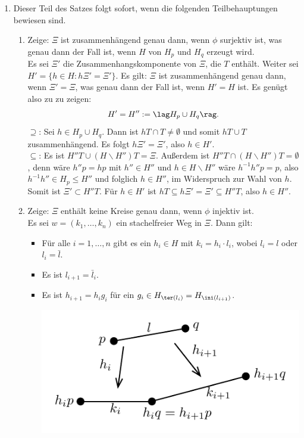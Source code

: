 \bew \begin{enumerate}
\item Dieser Teil des Satzes folgt sofort, wenn die folgenden
Teilbehauptungen bewiesen sind.
\begin{enumerate}
\item Zeige: $\Xi$ ist zusammenhängend genau dann, wenn $\phi$
surjektiv ist, was genau dann der Fall ist, wenn
$H$ von $H_p$ und $H_q$ erzeugt wird.\\
Es sei $\Xi'$ die Zusammenhangskomponente von $\Xi$, die $T$ enthält.
Weiter sei $H'=\{ h\in H : h\Xi' = \Xi' \}$.
Es gilt: $\Xi$ ist zusammenhängend genau dann, wenn $\Xi'=\Xi$, was
genau dann der Fall ist, wenn $H'=H$ ist.
Es genügt also zu zu zeigen:
\[
H' = H'' := \lag H_p \cup H_q \rag.
\]
\glqq$\supseteq$\grqq:
Sei $h\in H_p\cup H_q$. Dann ist
$hT\cap T\neq\emptyset$ und somit $hT\cup T$ zusammenhängend.
Es folgt $h\Xi'=\Xi'$, also $h\in H'$.\\
\glqq$\subseteq$\grqq:
Es ist $H'' T\cup(H\backslash H'')T= \Xi$. Außerdem ist
$H'' T\cap(H\backslash H'')T = \emptyset$, denn wäre
$h''p=hp$ mit $h''\in H''$ und $h\in H\backslash H''$
wäre $h^{-1}h''p=p$, also $h^{-1}h''\in H_p\leq H''$ und folglich
$h\in H''$, im Widerspruch zur Wahl von $h$.
Somit ist $\Xi'\subset H'' T$. Für $h\in H'$ ist
$hT\subseteq h\Xi'=\Xi'\subseteq H'' T$, also $h\in H''$.
\item Zeige: $\Xi$ enthält keine Kreise genau dann, wenn
$\phi$ injektiv ist.\\
Es sei $w=(k_1,\ldots,k_n)$ ein stachelfreier Weg in $\Xi$.
Dann gilt:
\begin{itemize}
\item Für alle $i=1,\ldots,n$ gibt es ein $h_i\in H$ mit
$k_i=h_i\cdot l_i$, wobei $l_i = l$ oder $l_i = \bar{l}$.
\item Es ist $l_{i+1}=\bar{l}_i$.
\item Es ist $h_{i+1}=h_i g_i$ für ein
$g_i\in H_{\ter(l_i)}=H_{\ini(l_{i+1})}$.
\begin{center}
	\includegraphics{grugraImages/pql}

\end{center}
\end{itemize}
\end{enumerate}
\end{enumerate}

